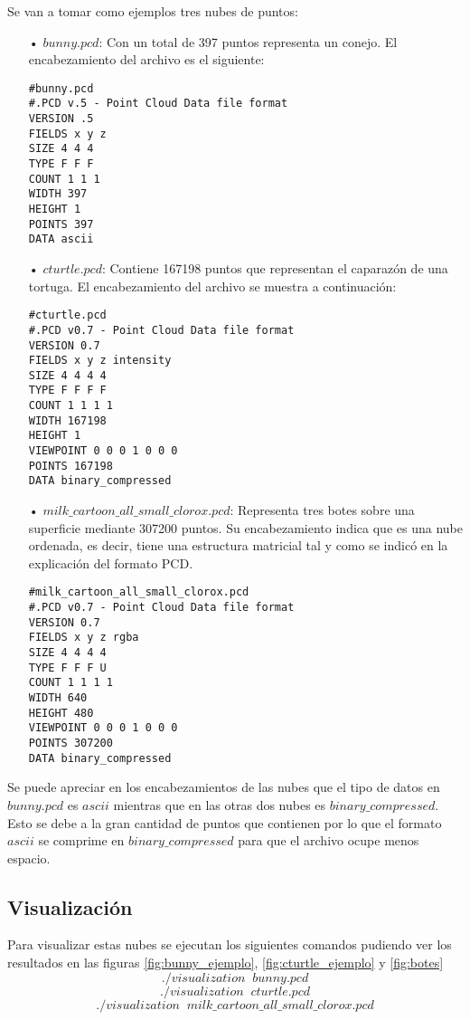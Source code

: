 Se van a tomar como ejemplos tres nubes de puntos:
\begin{itemize}
\item[•]$bunny.pcd$: 
Con un total de 397 puntos representa un conejo. El encabezamiento del archivo es el siguiente:\\
\begin{lstlisting}
#bunny.pcd
#.PCD v.5 - Point Cloud Data file format
VERSION .5
FIELDS x y z
SIZE 4 4 4
TYPE F F F
COUNT 1 1 1
WIDTH 397
HEIGHT 1
POINTS 397
DATA ascii
\end{lstlisting}

\item[•]$cturtle.pcd$:
Contiene 167198 puntos que representan el caparazón de una tortuga. El encabezamiento del archivo se muestra a continuación:\\
\begin{lstlisting}
#cturtle.pcd
#.PCD v0.7 - Point Cloud Data file format
VERSION 0.7
FIELDS x y z intensity
SIZE 4 4 4 4
TYPE F F F F
COUNT 1 1 1 1
WIDTH 167198
HEIGHT 1
VIEWPOINT 0 0 0 1 0 0 0
POINTS 167198
DATA binary_compressed
\end{lstlisting}


\item[•]$milk\_cartoon\_all\_small\_clorox.pcd$:
Representa tres botes sobre una superficie mediante 307200 puntos. Su encabezamiento indica que es una nube ordenada, es decir, tiene una estructura matricial tal y como se indicó en la explicación del formato PCD.\\
\begin{lstlisting}
#milk_cartoon_all_small_clorox.pcd
#.PCD v0.7 - Point Cloud Data file format
VERSION 0.7
FIELDS x y z rgba
SIZE 4 4 4 4
TYPE F F F U
COUNT 1 1 1 1
WIDTH 640
HEIGHT 480
VIEWPOINT 0 0 0 1 0 0 0
POINTS 307200
DATA binary_compressed
\end{lstlisting}

\end{itemize}

Se puede apreciar en los encabezamientos de las nubes que el tipo de datos en $bunny.pcd$ es $ascii$ mientras que en las otras dos nubes es $binary\_compressed$. Esto se debe a la gran cantidad de puntos que contienen por lo que el formato $ascii$ se comprime en $binary\_compressed$ para que el archivo ocupe menos espacio.

\subsection{Visualización}
Para visualizar estas nubes se ejecutan los siguientes comandos pudiendo ver los resultados en las figuras \ref{fig:bunny_ejemplo}, \ref{fig:cturtle_ejemplo} y \ref{fig:botes} 
$$./visualization\;\;bunny.pcd$$
$$./visualization\;\;cturtle.pcd$$
$$./visualization\;\;milk\_cartoon\_all\_small\_clorox.pcd$$

